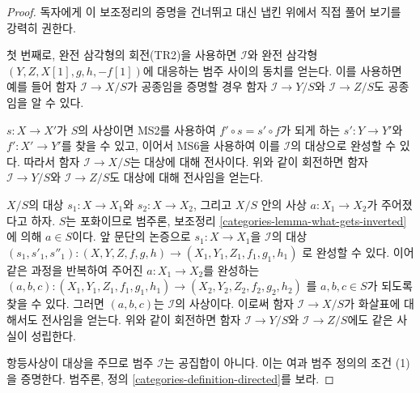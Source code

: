 \begin{proof}
독자에게 이 보조정리의 증명을 건너뛰고 대신 냅킨 위에서 직접 풀어
보기를 강력히 권한다.

\medskip\noindent
첫 번째로, 완전 삼각형의 회전(TR2)을 사용하면 $\mathcal{I}$와 완전
삼각형 $(Y, Z, X[1], g, h, -f[1])$에 대응하는 범주 사이의 동치를
얻는다. 이를 사용하면 예를 들어 함자 $\mathcal{I} \to X/S$가
공종임을 증명할 경우 함자 $\mathcal{I} \to Y/S$와
$\mathcal{I} \to Z/S$도 공종임을 알 수 있다.

\medskip\noindent
$s : X \to X'$가 $S$의 사상이면 MS2를 사용하여
$f' \circ s = s' \circ f$가 되게 하는 $s' : Y \to Y'$와
$f' : X' \to Y'$를 찾을 수 있고, 이어서 MS6을 사용하여 이를
$\mathcal{I}$의 대상으로 완성할 수 있다. 따라서 함자
$\mathcal{I} \to X/S$는 대상에 대해 전사이다. 위와 같이 회전하면
함자 $\mathcal{I} \to Y/S$와 $\mathcal{I} \to Z/S$도 대상에 대해
전사임을 얻는다.

\medskip\noindent
$X/S$의 대상 $s_1 : X \to X_1 $와 $s_2 : X \to X_2$, 그리고
$X/S$ 안의 사상 $a : X_1 \to X_2$가 주어졌다고 하자. $S$는
포화이므로 범주론, 보조정리
\ref{categories-lemma-what-gets-inverted}에 의해 $a \in S$이다.
앞 문단의 논증으로 $s_1 : X \to X_1$을 $\mathcal{I}$의 대상
$(s_1, s'_1, s''_1) : (X, Y, Z, f, g, h) \to (X_1, Y_1, Z_1, f_1, g_1, h_1)$
로 완성할 수 있다. 이어 같은 과정을 반복하여 주어진
$a : X_1 \to X_2$를 완성하는
$(a, b, c) : (X_1, Y_1, Z_1, f_1, g_1, h_1) \to (X_2, Y_2, Z_2, f_2, g_2, h_2)$
를 $a, b, c \in S$가 되도록 찾을 수 있다. 그러면 $(a, b, c)$는
$\mathcal{I}$의 사상이다. 이로써 함자 $\mathcal{I} \to X/S$가
화살표에 대해서도 전사임을 얻는다. 위와 같이 회전하면 함자
$\mathcal{I} \to Y/S$와 $\mathcal{I} \to Z/S$에도 같은 사실이
성립한다.

\medskip\noindent
항등사상이 대상을 주므로 범주 $\mathcal{I}$는 공집합이 아니다.
이는 여과 범주 정의의 조건 (1)을 증명한다. 범주론, 정의
\ref{categories-definition-directed}를 보라.


\end{proof}
